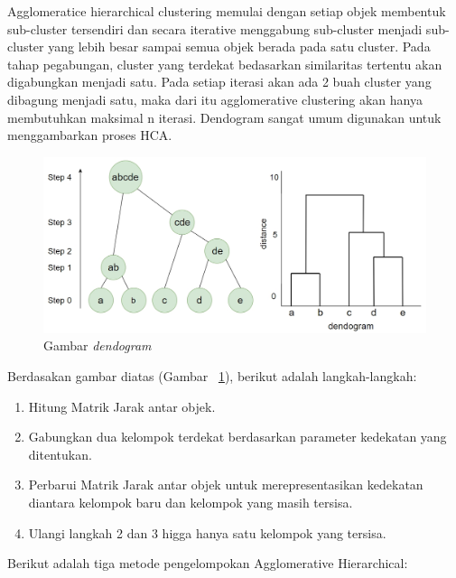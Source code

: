 \documentclass[a4paper,twoside]{article}
\begin{document}
\begin{enumerate}
Agglomeratice hierarchical clustering memulai dengan setiap objek membentuk sub-cluster tersendiri dan secara iterative menggabung sub-cluster menjadi sub-cluster yang lebih besar sampai semua objek berada pada satu cluster. Pada tahap pegabungan, cluster yang terdekat bedasarkan similaritas tertentu akan digabungkan menjadi satu. Pada setiap iterasi akan ada 2 buah cluster yang dibagung menjadi satu, maka dari itu agglomerative clustering akan hanya membutuhkan maksimal n iterasi. Dendogram sangat umum digunakan untuk menggambarkan proses HCA. \\


\begin{figure}[H]
    \centering  
    \includegraphics[scale=0.5]{dendo}  
    \caption[Gambar {\it dendogram} ]{Gambar {\it dendogram}} 
    \label{fig:dendo} 
\end{figure}

Berdasakan gambar diatas (Gambar ~\ref{fig:dendo}), berikut adalah langkah-langkah:

\begin{enumerate}

\item Hitung Matrik Jarak antar objek.

\item Gabungkan dua kelompok terdekat berdasarkan parameter kedekatan yang ditentukan.

\item Perbarui Matrik Jarak antar objek untuk merepresentasikan kedekatan diantara kelompok baru dan kelompok yang masih tersisa.

\item Ulangi langkah 2 dan 3 higga hanya satu kelompok yang tersisa.

\end{enumerate}

Berikut adalah tiga metode pengelompokan Agglomerative Hierarchical:


\end{enumerate}
\end{document}
